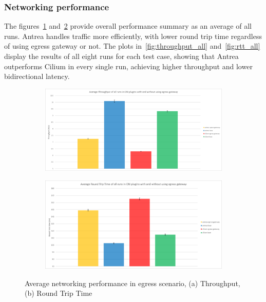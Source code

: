 \subsubsection{Networking performance}
\label{sec:egressNetworkingPerformance}

The figures~\ref{fig:throughput_avg} and~\ref{fig:rtt_avg} provide overall performance summary as an average of all runs. Antrea handles traffic more efficiently, with lower round trip time regardless of using egress gateway or not. The plots in~\ref{fig:throughput_all} and~\ref{fig:rtt_all} display the results of all eight runs for each test case, showing that Antrea outperforms Cilium in every single run, achieving higher throughput and lower bidirectional latency.

\begin{figure}[H]
    \centering
    \begin{subfigure}[b]{0.7\textwidth}
        \includegraphics[width=\textwidth]{plots/egress/throughput_total_average.png}
        \caption{}
        \label{fig:throughput_avg}
    \end{subfigure}
    \begin{subfigure}[b]{0.7\textwidth}
        \includegraphics[width=\textwidth]{plots/egress/rtt_total_average.png}
        \caption{}
        \label{fig:rtt_avg}
    \end{subfigure}
    
    \caption{Average networking performance in egress scenario, (a) Throughput, (b) Round Trip Time}
    \label{fig:networking_avg}
\end{figure}

